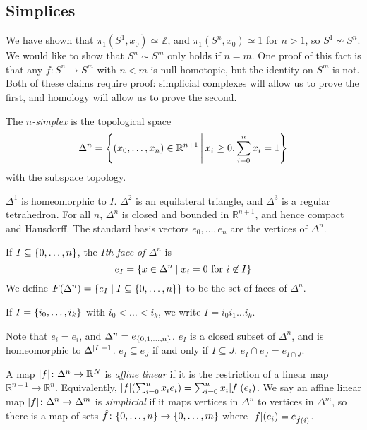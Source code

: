 \subsection{Simplices}
We have shown that \( \pi_1(S^1,x_0) \simeq \mathbb Z \), and \( \pi_1(S^n,x_0) \simeq 1 \) for \( n > 1 \), so \( S^1 \not\sim S^n \).
We would like to show that \( S^n \sim S^m \) only holds if \( n = m \).
One proof of this fact is that any \( f \colon S^n \to S^m \) with \( n < m \) is null-homotopic, but the identity on \( S^m \) is not.
Both of these claims require proof: simplicial complexes will allow us to prove the first, and homology will allow us to prove the second.
\begin{definition}
	The \emph{\( n \)-simplex} is the topological space
	\[ \Delta^n  = \qty{(x_0, \dots, x_n) \in \mathbb R^{n+1} \,\middle|\,x_i \geq 0, \sum_{i=0}^n x_i = 1 } \]
	with the subspace topology.
\end{definition}
\begin{remark}
	\( \Delta^1 \) is homeomorphic to \( I \).
	\( \Delta^2 \) is an equilateral triangle, and \( \Delta^3 \) is a regular tetrahedron.
	For all \( n \), \( \Delta^n \) is closed and bounded in \( \mathbb R^{n+1} \), and hence compact and Hausdorff.
	The standard basis vectors \( e_0, \dots, e_n \) are the vertices of \( \Delta^n \).
\end{remark}
\begin{definition}
	If \( I \subseteq \qty{0, \dots, n} \), the \emph{\( I \)th face of \( \Delta^n \)} is
	\[ e_I = \qty{x \in \Delta^n \mid x_i = 0 \text{ for } i \not\in I} \]
	We define \( F(\Delta^n) = \qty{e_I \mid I \subseteq \qty{0,\dots, n}} \) to be the set of faces of \( \Delta^n \).
\end{definition}
If \( I = \qty{i_0, \dots, i_k} \) with \( i_0 < \dots < i_k \), we write \( I = i_0i_1\dots i_k \).
\begin{remark}
	Note that \( e_{\qty{i}} = e_i \), and \( \Delta^n = e_{\qty{0,1, \dots, n}} \).
	\( e_I \) is a closed subset of \( \Delta^n \), and is homeomorphic to \( \Delta^{\abs{I} - 1} \).
	\( e_I \subseteq e_J \) if and only if \( I \subseteq J \).
	\( e_I \cap e_J = e_{I \cap J} \).
\end{remark}
\begin{definition}
	A map \( \abs{f} \colon \Delta^n \to \mathbb R^N \) is \emph{affine linear} if it is the restriction of a linear map \( \mathbb R^{n+1} \to \mathbb R^n \).
	Equivalently, \( \abs{f}\qty(\sum_{i=0}^n x_i e_i) = \sum_{i=0}^n x_i \abs{f}(e_i) \).
	We say an affine linear map \( \abs{f} \colon \Delta^n \to \Delta^m \) is \emph{simplicial} if it maps vertices in \( \Delta^n \) to vertices in \( \Delta^m \), so there is a map of sets \( \hat f \colon \qty{0,\dots, n} \to \qty{0, \dots, m} \) where \( \abs{f}(e_i) = e_{\hat f(i)} \).
\end{definition}
